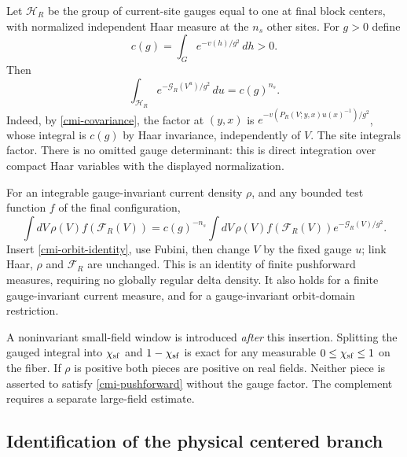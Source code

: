\documentclass[11pt]{article}
\theoremstyle{remark}
\begin{document}
Let $\mathcal H_R$ be the group of current-site gauges equal to
one at final block centers, with normalized independent Haar
measure at the $n_s$ other sites. For $g>0$ define
\begin{equation}\label{cmi-gauge-constant}
 c(g)=\int_G e^{-v(h)/g^2}\,dh>0.
\end{equation}
Then
\begin{equation}\label{cmi-orbit-identity}
 \int_{\mathcal H_R}e^{-\mathcal G_R(V^u)/g^2}\,du
       =c(g)^{n_s}.
\end{equation}
Indeed, by \eqref{cmi-covariance}, the factor at $(y,x)$ is
$e^{-v(P_R(V;y,x)u(x)^{-1})/g^2}$, whose integral is $c(g)$
by Haar invariance, independently of $V$. The site integrals
factor. There is no omitted gauge determinant: this is direct
integration over compact Haar variables with the displayed
normalization.

For an integrable gauge-invariant current density $\rho$, and
any bounded test function $f$ of the final configuration,
\begin{equation}\label{cmi-pushforward}
 \int dV\,\rho(V)f(\mathcal F_R(V))
 =c(g)^{-n_s}\int dV\,\rho(V)f(\mathcal F_R(V))
                            e^{-\mathcal G_R(V)/g^2}.
\end{equation}
Insert \eqref{cmi-orbit-identity}, use Fubini, then change
$V$ by the fixed gauge $u$; link Haar, $\rho$ and $\mathcal F_R$
are unchanged. This is an identity of finite pushforward
measures, requiring no globally regular delta density.
It also holds for a finite gauge-invariant current measure,
and for a gauge-invariant orbit-domain restriction.

A noninvariant small-field window is introduced \emph{after}
this insertion. Splitting the gauged integral into $\chi_{\rm sf}$
and $1-\chi_{\rm sf}$ is exact for any measurable
$0\le\chi_{\rm sf}\le1$ on the fiber. If $\rho$ is positive
both pieces are positive on real fields. Neither piece is
asserted to satisfy \eqref{cmi-pushforward} without the gauge
factor. The complement requires a separate large-field estimate.

\subsection{Identification of the physical centered branch}
\label{cmi-branch-section}
\end{document}
